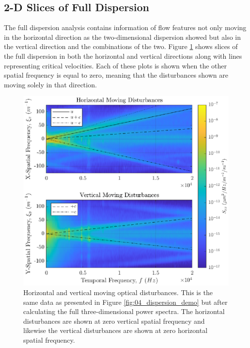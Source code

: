 \subsection{2-D Slices of Full Dispersion}
The full dispersion analysis contains information of flow features not only moving in the horizontal direction as the two-dimensional dispersion showed but also in the vertical direction and the combinations of the two.
Figure \ref{fig:04_dispersion_xy} shows slices of the full dispersion in both the horizontal and vertical directions along with lines representing critical velocities.
Each of these plots is shown when the other spatial frequency is equal to zero, meaning that the disturbances shown are moving solely in that direction.
\begin{figure}
  \centering
  \includegraphics{../matlab/04_dispersion_analysis/dispersion_xy.eps}
  \caption{Horizontal and vertical moving optical disturbances. This is the same data as presented in Figure \ref{fig:04_dispersion_demo} but after calculating the full three-dimensional power spectra. The horizontal disturbances are shown at zero vertical spatial frequency and likewise the vertical disturbances are shown at zero horizontal spatial frequency.}
  \label{fig:04_dispersion_xy}
\end{figure}

